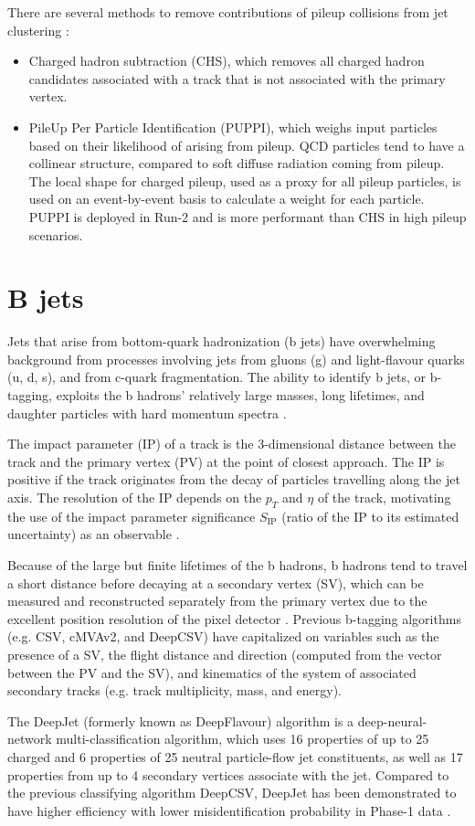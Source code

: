 There are several methods to remove contributions of pileup collisions from jet clustering \cite{CMS-PAS-JME-14-001}:
\begin{itemize}
    \item Charged hadron subtraction (CHS), which removes all charged hadron candidates associated with a track that is not associated with the primary vertex.
    \item PileUp Per Particle Identification (PUPPI), which weighs input particles based on their likelihood of arising from pileup. QCD particles tend to have a collinear structure, compared to soft diffuse radiation coming from pileup. The local shape for charged pileup, used as a proxy for all pileup particles, is used on an event-by-event basis to calculate a weight for each particle. PUPPI is deployed in Run-2 and is more performant than CHS in high pileup scenarios.
\end{itemize}

\section{B jets}
Jets that arise from bottom-quark hadronization (b jets) have overwhelming background from processes involving jets from gluons (g) and light-flavour quarks (u, d, s), and from c-quark fragmentation. The ability to identify b jets, or b-tagging, exploits the b hadrons' relatively large masses, long lifetimes, and daughter particles with hard momentum spectra \cite{CMS-BTV-12-001}. 

The impact parameter (IP) of a track is the 3-dimensional distance between the track and the primary vertex (PV) at the point of closest approach. The IP is positive if the track originates from the decay of particles travelling along the jet axis. The resolution of the IP depends on the $p_{T}$ and $\eta$ of the track, motivating the use of the impact parameter significance $S_{\text{IP}}$ (ratio of the IP to its estimated uncertainty) as an observable \cite{CMS-BTV-12-001}.

Because of the large but finite lifetimes of the b hadrons, b hadrons tend to travel a short distance before decaying at a secondary vertex (SV), which can be measured and reconstructed separately from the primary vertex due to the excellent position resolution of the pixel detector \cite{CMS-BTV-12-001}. Previous b-tagging algorithms (e.g. CSV, cMVAv2, and DeepCSV) have capitalized on variables such as the presence of a SV, the flight distance and direction (computed from the vector between the PV and the SV), and kinematics of the system of associated secondary tracks (e.g. track multiplicity, mass, and energy). 

The DeepJet (formerly known as DeepFlavour) algorithm \cite{CMS-DP-2017-013} is a deep-neural-network multi-classification algorithm, which uses 16 properties of up to 25 charged and 6 properties of 25 neutral particle-flow jet constituents, as well as 17 properties from up to 4 secondary vertices associate with the jet. Compared to the previous classifying algorithm DeepCSV, DeepJet has been demonstrated to have higher efficiency with lower misidentification probability in Phase-1 data \cite{CMS-DP-2018-058}. 
